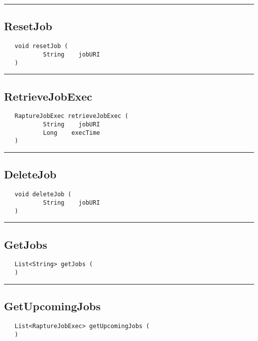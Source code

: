 \rule{15cm}{2pt}
\subsection{ResetJob}
\label{Api:ResetJob}
\begin{verbatim}
   void resetJob (
           String    jobURI
   )
\end{verbatim}



\rule{15cm}{2pt}
\subsection{RetrieveJobExec}
\label{Api:RetrieveJobExec}
\begin{verbatim}
   RaptureJobExec retrieveJobExec (
           String    jobURI
           Long    execTime
   )
\end{verbatim}



\rule{15cm}{2pt}
\subsection{DeleteJob}
\label{Api:DeleteJob}
\begin{verbatim}
   void deleteJob (
           String    jobURI
   )
\end{verbatim}



\rule{15cm}{2pt}
\subsection{GetJobs}
\label{Api:GetJobs}
\begin{verbatim}
   List<String> getJobs (
   )
\end{verbatim}



\rule{15cm}{2pt}
\subsection{GetUpcomingJobs}
\label{Api:GetUpcomingJobs}
\begin{verbatim}
   List<RaptureJobExec> getUpcomingJobs (
   )
\end{verbatim}



